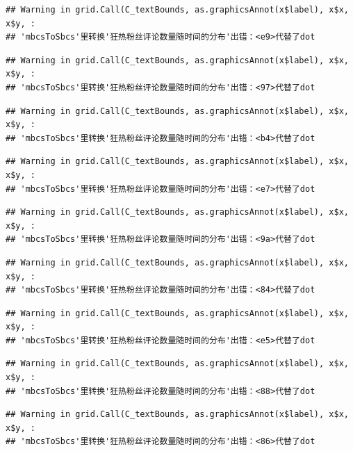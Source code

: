 \documentclass[
]{article}
\begin{document}
\begin{verbatim}
## Warning in grid.Call(C_textBounds, as.graphicsAnnot(x$label), x$x, x$y, :
## 'mbcsToSbcs'里转换'狂热粉丝评论数量随时间的分布'出错：<e9>代替了dot
\end{verbatim}

\begin{verbatim}
## Warning in grid.Call(C_textBounds, as.graphicsAnnot(x$label), x$x, x$y, :
## 'mbcsToSbcs'里转换'狂热粉丝评论数量随时间的分布'出错：<97>代替了dot
\end{verbatim}

\begin{verbatim}
## Warning in grid.Call(C_textBounds, as.graphicsAnnot(x$label), x$x, x$y, :
## 'mbcsToSbcs'里转换'狂热粉丝评论数量随时间的分布'出错：<b4>代替了dot
\end{verbatim}

\begin{verbatim}
## Warning in grid.Call(C_textBounds, as.graphicsAnnot(x$label), x$x, x$y, :
## 'mbcsToSbcs'里转换'狂热粉丝评论数量随时间的分布'出错：<e7>代替了dot
\end{verbatim}

\begin{verbatim}
## Warning in grid.Call(C_textBounds, as.graphicsAnnot(x$label), x$x, x$y, :
## 'mbcsToSbcs'里转换'狂热粉丝评论数量随时间的分布'出错：<9a>代替了dot
\end{verbatim}

\begin{verbatim}
## Warning in grid.Call(C_textBounds, as.graphicsAnnot(x$label), x$x, x$y, :
## 'mbcsToSbcs'里转换'狂热粉丝评论数量随时间的分布'出错：<84>代替了dot
\end{verbatim}

\begin{verbatim}
## Warning in grid.Call(C_textBounds, as.graphicsAnnot(x$label), x$x, x$y, :
## 'mbcsToSbcs'里转换'狂热粉丝评论数量随时间的分布'出错：<e5>代替了dot
\end{verbatim}

\begin{verbatim}
## Warning in grid.Call(C_textBounds, as.graphicsAnnot(x$label), x$x, x$y, :
## 'mbcsToSbcs'里转换'狂热粉丝评论数量随时间的分布'出错：<88>代替了dot
\end{verbatim}

\begin{verbatim}
## Warning in grid.Call(C_textBounds, as.graphicsAnnot(x$label), x$x, x$y, :
## 'mbcsToSbcs'里转换'狂热粉丝评论数量随时间的分布'出错：<86>代替了dot
\end{verbatim}
\end{document}
